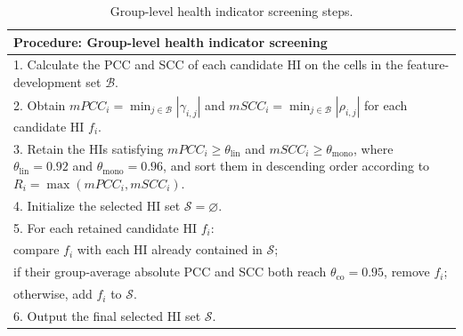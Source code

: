 \begin{table}[!htb]
\TableStyle
\caption{Group-level health indicator screening steps.}
\label{tab:2-hi-screening-steps}
\begin{tabularx}{\linewidth}{@{}X@{}}
\toprule
\textbf{Procedure: Group-level health indicator screening} \\
\midrule
1. Calculate the PCC and SCC of each candidate HI on the cells in the feature-development set $\mathcal{B}$. \\
2. Obtain $mPCC_i=\min_{j\in\mathcal{B}}|\gamma_{i,j}|$ and $mSCC_i=\min_{j\in\mathcal{B}}|\rho_{i,j}|$ for each candidate HI $f_i$. \\
3. Retain the HIs satisfying $mPCC_i\geq\theta_{\mathrm{lin}}$ and $mSCC_i\geq\theta_{\mathrm{mono}}$, where $\theta_{\mathrm{lin}}=0.92$ and $\theta_{\mathrm{mono}}=0.96$, and sort them in descending order according to $R_i=\max(mPCC_i,mSCC_i)$. \\
4. Initialize the selected HI set $\mathcal{S}=\varnothing$. \\
5. For each retained candidate HI $f_i$: \\
\hspace*{1em}compare $f_i$ with each HI already contained in $\mathcal{S}$; \\
\hspace*{1em}if their group-average absolute PCC and SCC both reach $\theta_{\mathrm{co}}=0.95$, remove $f_i$; \\
\hspace*{1em}otherwise, add $f_i$ to $\mathcal{S}$. \\
6. Output the final selected HI set $\mathcal{S}$. \\
\bottomrule
\end{tabularx}
\end{table}
